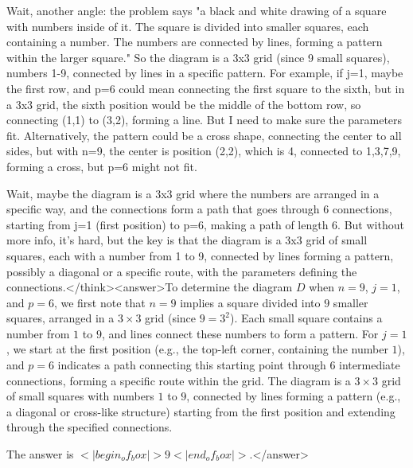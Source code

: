 Wait, another angle: the problem says "a black and white drawing of a square with numbers inside of it. The square is divided into smaller squares, each containing a number. The numbers are connected by lines, forming a pattern within the larger square." So the diagram is a 3x3 grid (since 9 small squares), numbers 1-9, connected by lines in a specific pattern. For example, if j=1, maybe the first row, and p=6 could mean connecting the first square to the sixth, but in a 3x3 grid, the sixth position would be the middle of the bottom row, so connecting (1,1) to (3,2), forming a line. But I need to make sure the parameters fit. Alternatively, the pattern could be a cross shape, connecting the center to all sides, but with n=9, the center is position (2,2), which is 4, connected to 1,3,7,9, forming a cross, but p=6 might not fit.

Wait, maybe the diagram is a 3x3 grid where the numbers are arranged in a specific way, and the connections form a path that goes through 6 connections, starting from j=1 (first position) to p=6, making a path of length 6. But without more info, it's hard, but the key is that the diagram is a 3x3 grid of small squares, each with a number from 1 to 9, connected by lines forming a pattern, possibly a diagonal or a specific route, with the parameters defining the connections.</think><answer>To determine the diagram \( D \) when \( n = 9 \), \( j = 1 \), and \( p = 6 \), we first note that \( n = 9 \) implies a square divided into \( 9 \) smaller squares, arranged in a \( 3 \times 3 \) grid (since \( 9 = 3^2 \)). Each small square contains a number from \( 1 \) to \( 9 \), and lines connect these numbers to form a pattern. For \( j = 1 \), we start at the first position (e.g., the top-left corner, containing the number \( 1 \)), and \( p = 6 \) indicates a path connecting this starting point through \( 6 \) intermediate connections, forming a specific route within the grid. The diagram is a \( 3 \times 3 \) grid of small squares with numbers \( 1 \) to \( 9 \), connected by lines forming a pattern (e.g., a diagonal or cross-like structure) starting from the first position and extending through the specified connections.

The answer is \(<|begin_of_box|>9<|end_of_box|>\).</answer>